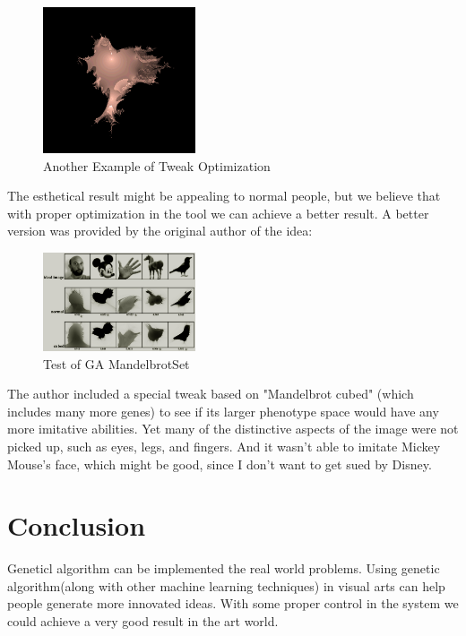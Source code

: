 \documentclass[fleqn,10pt]{SelfArx} %
\begin{document}
\begin{figure}[h!]
  \centering
      \includegraphics[width=0.4\textwidth]{tweak2.png}
  \caption{Another Example of Tweak Optimization}
\end{figure}


The esthetical result might be appealing to normal people, but we
believe that with proper optimization in the tool we can achieve a
better result. A better version was provided by the original author of
the idea:


\begin{figure}[h!]
  \centering
      \includegraphics[width=0.4\textwidth]{test.jpg}
  \caption{Test of GA MandelbrotSet}
\end{figure}

The author  included a special tweak based on "Mandelbrot cubed" (which includes many more genes) to see if its larger phenotype space would have any more imitative abilities.
Yet many of the distinctive aspects of the image were not picked up, such as eyes, legs, and fingers. And it wasn't able to imitate Mickey Mouse's face, which might be good, since I don't want to get sued by Disney.


\section*{Conclusion} %
Geneticl algorithm can be implemented the real world problems. Using
genetic algorithm(along with other machine learning techniques) in
visual arts can help people generate more innovated ideas. With some
proper control in the system we could achieve a very good result in
the art world.




\end{document}
